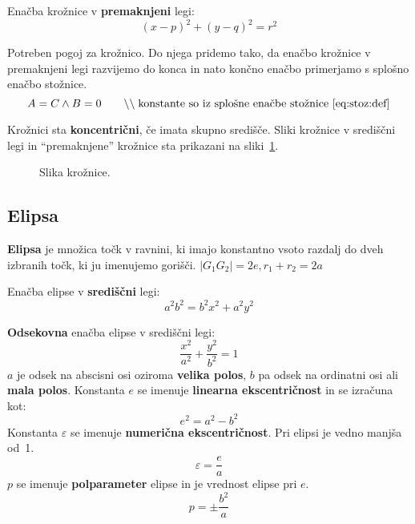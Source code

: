 \documentclass[a4paper,oneside,12pt,fleqn]{article}
\newcommand{\comment}[1]{\ensuremath{\qquad\backslash\backslash\;}\textnormal{#1}}
\newcommand{\beforecaptionskip}{\vspace{-12pt}}
\numberwithin{equation}{section}
\begin{document}
Enačba krožnice v \textbf{premaknjeni} legi:
\[ (x-p)^2 + (y-q)^2 = r^2 \]

Potreben pogoj za krožnico. Do njega pridemo tako, da enačbo krožnice v premaknjeni legi
razvijemo do konca in nato končno enačbo primerjamo s splošno enačbo stožnice.
\[ A = C \land B = 0 \comment{konstante so iz splošne enačbe stožnice \eqref{eq:stoz:def}} \]

Krožnici sta \textbf{koncentrični}, če imata skupno središče.
Sliki krožnice v središčni legi in ``premaknjene'' krožnice sta prikazani na
sliki~\ref{fig:stoz:kroz}.

\begin{figure}[ht]
  \begin{center}
  \end{center}
  \beforecaptionskip
  \caption{Slika krožnice.}
  \label{fig:stoz:kroz}
\end{figure}

\subsection{Elipsa}
\label{sec:stoz:elips}
\textbf{Elipsa} je množica točk v ravnini, ki imajo konstantno vsoto razdalj do dveh izbranih točk,
ki ju imenujemo gorišči. $|G_1G_2| = 2e, r_1 + r_2 = 2a$

Enačba elipse v \textbf{središčni} legi:
\[ a^2b^2 = b^2x^2 + a^2y^2 \]

\textbf{Odsekovna} enačba elipse v središčni legi:
\[ \frac{x^2}{a^2} + \frac{y^2}{b^2} = 1 \]
$a$ je odsek na abscisni osi oziroma \textbf{velika polos}, $b$ pa odsek na ordinatni osi
ali \textbf{mala polos}. Konstanta $e$ se imenuje \textbf{linearna ekscentričnost} in se izračuna kot:
\[ e^2 = a^2 - b^2 \]
Konstanta $\varepsilon$ se imenuje \textbf{numerična ekscentričnost}. Pri elipsi je vedno
manjša od~1.
\[ \varepsilon  = \frac{e}{a} \]
$p$ se imenuje \textbf{polparameter} elipse in je vrednost elipse pri $e$.
\[ p = \pm \frac{b^2}{a} \]
\end{document}
